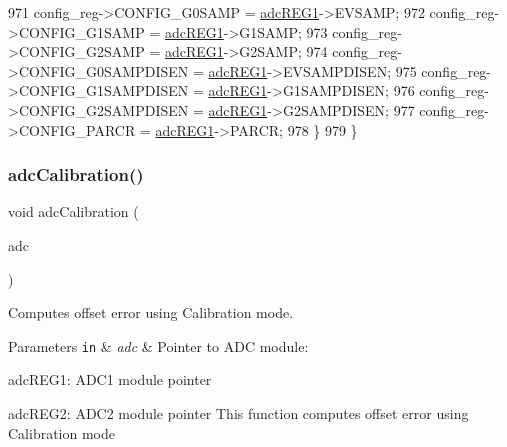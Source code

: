 \begin{DoxyCode}
971         config\_reg->CONFIG\_G0SAMP = \mbox{\hyperlink{reg__adc_8h_a3b9540af9f841ba3127f14b1c9208c57}{adcREG1}}->EVSAMP;
972         config\_reg->CONFIG\_G1SAMP = \mbox{\hyperlink{reg__adc_8h_a3b9540af9f841ba3127f14b1c9208c57}{adcREG1}}->G1SAMP;
973         config\_reg->CONFIG\_G2SAMP = \mbox{\hyperlink{reg__adc_8h_a3b9540af9f841ba3127f14b1c9208c57}{adcREG1}}->G2SAMP;
974         config\_reg->CONFIG\_G0SAMPDISEN = \mbox{\hyperlink{reg__adc_8h_a3b9540af9f841ba3127f14b1c9208c57}{adcREG1}}->EVSAMPDISEN;
975         config\_reg->CONFIG\_G1SAMPDISEN = \mbox{\hyperlink{reg__adc_8h_a3b9540af9f841ba3127f14b1c9208c57}{adcREG1}}->G1SAMPDISEN;
976         config\_reg->CONFIG\_G2SAMPDISEN = \mbox{\hyperlink{reg__adc_8h_a3b9540af9f841ba3127f14b1c9208c57}{adcREG1}}->G2SAMPDISEN;
977         config\_reg->CONFIG\_PARCR = \mbox{\hyperlink{reg__adc_8h_a3b9540af9f841ba3127f14b1c9208c57}{adcREG1}}->PARCR;
978     \}
979 \}
\end{DoxyCode}
\mbox{\label{group__ADC_ga6f24721d9ed4247b69f1f818585253f0}} 
\subsubsection{\texorpdfstring{adc\+Calibration()}{adcCalibration()}}
{\footnotesize\ttfamily void adc\+Calibration (\begin{DoxyParamCaption}\item[{\mbox{\hyperlink{reg__adc_8h_ab98b3b090eb1fd96596cd337a5fc0a4e}{adc\+B\+A\+S\+E\+\_\+t}} $\ast$}]{adc }\end{DoxyParamCaption})}



Computes offset error using Calibration mode. 


\begin{DoxyParams}[1]{Parameters}
\mbox{\tt in}  & {\em adc} & Pointer to A\+DC module\+:
\begin{DoxyItemize}
\item adc\+R\+E\+G1\+: A\+D\+C1 module pointer
\item adc\+R\+E\+G2\+: A\+D\+C2 module pointer This function computes offset error using Calibration mode 
\end{DoxyItemize}\\
\hline
\end{DoxyParams}

